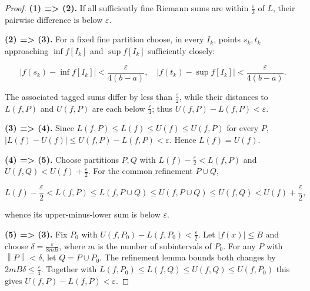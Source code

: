 \begin{proof}

\textbf{(1) =\textgreater{} (2).} If all sufficiently fine Riemann sums are within \(\frac{\varepsilon}{2}\) of \(L\), their pairwise difference is below \(\varepsilon\).

\textbf{(2) =\textgreater{} (3).} For a fixed fine partition choose, in every \(I_{k}\), points \(s_{k},t_{k}\) approaching \(\inf f\left\lbrack I_{k} \right\rbrack\) and \(\sup f\left\lbrack I_{k} \right\rbrack\) sufficiently closely:

\[\left| {f\left( s_{k} \right) - \inf f\left\lbrack I_{k} \right\rbrack} \right| < \frac{\varepsilon}{4\left( {b - a} \right)},\quad\left| {f\left( t_{k} \right) - \sup f\left\lbrack I_{k} \right\rbrack} \right| < \frac{\varepsilon}{4\left( {b - a} \right)}.\]

The associated tagged sums differ by less than \(\frac{\varepsilon}{2}\), while their distances to \(L\left( {f,P} \right)\) and \(U\left( {f,P} \right)\) are each below \(\frac{\varepsilon}{4}\); thus \(U\left( {f,P} \right) - L\left( {f,P} \right) < \varepsilon\).

\textbf{(3) =\textgreater{} (4).} Since \(L\left( {f,P} \right) \leq L(f) \leq U(f) \leq U\left( {f,P} \right)\) for every \(P\), \(\left| {L(f) - U(f)} \right| \leq U\left( {f,P} \right) - L\left( {f,P} \right) < \varepsilon\). Hence \(L(f) = U(f)\).

\textbf{(4) =\textgreater{} (5).} Choose partitions \(P,Q\) with \(L(f) - \frac{\varepsilon}{2} < L\left( {f,P} \right)\) and \(U\left( {f,Q} \right) < U(f) + \frac{\varepsilon}{2}\). For the common refinement \(P \cup Q\),

\[L(f) - \frac{\varepsilon}{2} < L\left( {f,P} \right) \leq L\left( {f,P \cup Q} \right) \leq U\left( {f,P \cup Q} \right) \leq U\left( {f,Q} \right) < U(f) + \frac{\varepsilon}{2},\]

whence its upper-minus-lower sum is below \(\varepsilon\).

\textbf{(5) =\textgreater{} (3).} Fix \(P_{0}\) with \(U\left( {f,P_{0}} \right) - L\left( {f,P_{0}} \right) < \frac{\varepsilon}{2}\). Let \(\left| {f(x)} \right| \leq B\) and choose \(\delta = \frac{\varepsilon}{8mB}\), where \(m\) is the number of subintervals of \(P_{0}\). For any \(P\) with \(\left\| P \right\| < \delta\), let \(Q = P \cup P_{0}\). The refinement lemma bounds both changes by \(2mB\delta \leq \frac{\varepsilon}{4}\). Together with \(L\left( {f,P_{0}} \right) \leq L\left( {f,Q} \right) \leq U\left( {f,Q} \right) \leq U\left( {f,P_{0}} \right)\) this gives \(U\left( {f,P} \right) - L\left( {f,P} \right) < \varepsilon\).

\end{proof}

